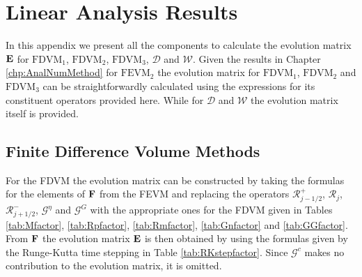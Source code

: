 \chapter{Linear Analysis Results}
\label{app:LinAnal}
In this appendix we present all the components to calculate the evolution matrix $\mathbf{E}$ for $\text{FDVM}_1$, $\text{FDVM}_2$, $\text{FDVM}_3$, $\mathcal{D}$ and $\mathcal{W}$. Given the results in Chapter \ref{chp:AnalNumMethod} for $\text{FEVM}_2$ the evolution matrix for $\text{FDVM}_1$, $\text{FDVM}_2$ and $\text{FDVM}_3$ can be straightforwardly calculated using the expressions for its constituent operators provided here. While for $\mathcal{D}$ and $\mathcal{W}$ the evolution matrix itself is provided.  

\section{Finite Difference Volume Methods}
For the FDVM the evolution matrix can be constructed by taking the formulas for the elements of $\mathbf{F}$ from the FEVM and replacing the operators $\mathcal{R}^+_{j-1/2}$, $\mathcal{R}_j$, $\mathcal{R}^-_{j+1/2}$, $\mathcal{G}^\eta$ and $\mathcal{G}^G$  with the appropriate ones for the FDVM given in Tables \ref{tab:Mfactor}, \ref{tab:Rpfactor}, \ref{tab:Rmfactor}, \ref{tab:Gnfactor} and \ref{tab:GGfactor}. From $\mathbf{F}$ the evolution matrix $\mathbf{E}$ is then obtained by using the formulas given by the Runge-Kutta time stepping in Table \ref{tab:RKstepfactor}. Since $\mathcal{G}^c$ makes no contribution to the evolution matrix, it is omitted.

